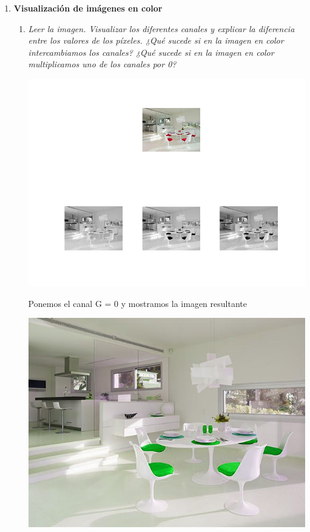 \documentclass[a4paper,10pt]{article}
\begin{document}
\begin{enumerate}
\newpage

 \item \textbf{Visualización de imágenes en color}
 
 \begin{enumerate}
 \item \textit{Leer	la imagen. Visualizar los diferentes canales y explicar la diferencia entre los	valores de los píxeles. ¿Qué sucede si en la imagen en color intercambiamos los canales? ¿Qué sucede si en la imagen en color multiplicamos uno de los canales por 0?}

 \begin{center}
 \includegraphics[scale=0.5]{subplot_5}
 \end{center}
 
 Ponemos el canal G = 0 y mostramos la imagen resultante
 
 \begin{center}
 \includegraphics[scale=0.5]{ej15_cambiados} 
 \end{center}
 


\end{enumerate}
\end{enumerate}
\end{document}
